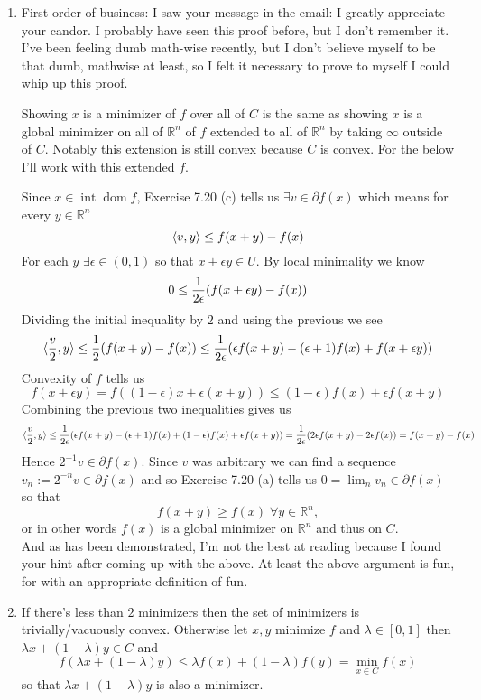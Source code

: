\documentclass{article}
\newenvironment{ex}[1]
  {\renewcommand\theexercise{#1}\exercise}
  {\endexercise}
\DeclareMathOperator*{\dom}{dom}
\DeclareMathOperator*{\inte}{int}
\newcommand{\R}[1]{\mathbb{R}^{#1}}
\begin{document}
\begin{ex}{7.24} %
  \begin{enumerate}[label=(\alph*)] \, \\
    \item
      First order of business: I saw your message in the email: I greatly appreciate your candor. I probably have seen this proof before, but I don't remember it. I've been feeling dumb math-wise recently, but I don't believe myself to be that dumb, mathwise at least, so I felt it necessary to prove to myself I could whip up this proof.

      Showing $x$ is a minimizer of $f$ over all of $C$ is the same as showing $x$ is a global minimizer on all of $\R{n}$ of $f$ extended to all of $\R{n}$ by taking $\infty$ outside of $C$. Notably this extension is still convex because $C$ is convex. For the below I'll work with this extended $f$.

      Since $x \in \inte \dom f$, Exercise 7.20 (c) tells us $\exists v \in \partial f(x)$ which means for every $y \in \R{n}$
      $$
      \langle v, y\rangle \le f(x+y) - f(x)
      $$
      For each $y$ $\exists \epsilon \in (0, 1)$ so that $x + \epsilon y \in U$. By local minimality we know
      $$
      0 \le \frac{1}{2\epsilon} (f(x + \epsilon y) - f(x))
      $$
      Dividing the initial inequality by $2$ and using the previous we see
      $$
      \langle\frac{v}{2}, y\rangle \le \frac{1}{2} (f(x+y) - f(x)) \le \frac{1}{2\epsilon} (\epsilon f(x+y) - (\epsilon+1)f(x) + f(x + \epsilon y))
      $$
      Convexity of $f$ tells us
      $$
      f(x + \epsilon y) = f((1-\epsilon)x + \epsilon(x+y)) \le (1-\epsilon)f(x) + \epsilon f(x+y)
      $$
      Combining the previous two inequalities gives us
      $$
      \langle\frac{v}{2}, y\rangle \le \frac{1}{2\epsilon} (\epsilon f(x+y) - (\epsilon+1)f(x) + (1-\epsilon)f(x) + \epsilon f(x+y)) = \frac{1}{2\epsilon} (2\epsilon f(x+y) - 2\epsilon f(x)) = f(x+y) - f(x)
      $$
      Hence $2^{-1}v \in \partial f(x)$. Since $v$ was arbitrary we can find a sequence $v_n := 2^{-n} v \in \partial f(x)$ and so Exercise 7.20 (a) tells us $0 = \lim_n v_n \in \partial f(x)$ so that
      $$
      f(x+y) \ge f(x) \; \forall y \in \R{n},
      $$
      or in other words $f(x)$ is a global minimizer on $\R{n}$ and thus on $C$. \, \\

      And as has been demonstrated, I'm not the best at reading because I found your hint after coming up with the above. At least the above argument is fun, for with an appropriate definition of fun.
    \item
      If there's less than $2$ minimizers then the set of minimizers is trivially/vacuously convex. Otherwise let $x, y$ minimize $f$ and $\lambda \in [0, 1]$ then $\lambda x + (1-\lambda)y \in C$ and
      $$
      f(\lambda x + (1-\lambda)y) \le \lambda f(x) + (1-\lambda)f(y) = \min_{x \in C} f(x)
      $$
      so that $\lambda x + (1-\lambda)y$ is also a minimizer.


\end{enumerate}
\end{ex}
\end{document}
